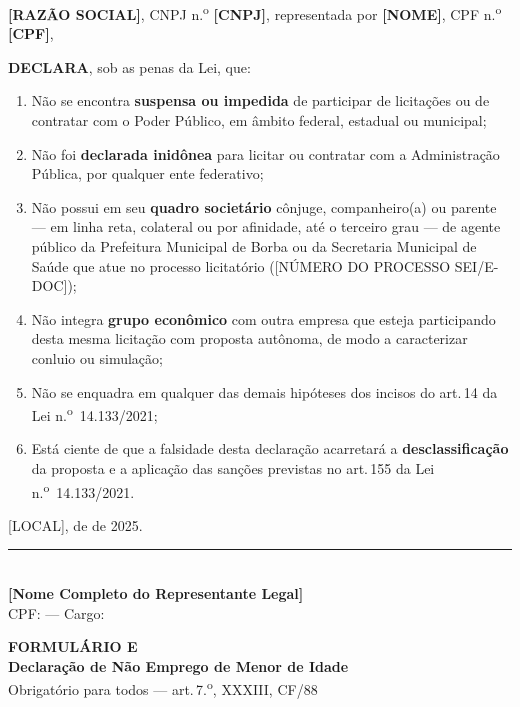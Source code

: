 \documentclass[12pt,a4paper]{article}
\newcommand{\formulario}[3]{%
  \clearpage
  \begin{tcolorbox}[enhanced,colback=navy,colframe=navy,arc=6pt,
    left=14pt,right=14pt,top=10pt,bottom=10pt]
    \color{white}
    {\large\bfseries FORMULÁRIO #1}\\[4pt]
    {\Large\bfseries #2}\\[4pt]
    {\small\color{ltblue} #3}
  \end{tcolorbox}
  \vspace{0.3cm}}
\newcommand{\art}[1]{art.\,#1}
\newcommand{\blank}[1]{\underline{\hspace{#1}}}
\newcommand{\procNum}{[NÚMERO DO PROCESSO SEI/E-DOC]}
\newcommand{\exercicio}{2025}
\begin{document}
\bigskip
\noindent\textbf{[RAZÃO SOCIAL]}, CNPJ n.\textsuperscript{o} \textbf{[CNPJ]},
representada por \textbf{[NOME]}, CPF n.\textsuperscript{o} \textbf{[CPF]},

\bigskip
\noindent\textbf{DECLARA}, sob as penas da Lei, que:

\begin{enumerate}
  \item Não se encontra \textbf{suspensa ou impedida} de participar de
    licitações ou de contratar com o Poder Público, em âmbito federal,
    estadual ou municipal;

  \item Não foi \textbf{declarada inidônea} para licitar ou contratar com a
    Administração Pública, por qualquer ente federativo;

  \item Não possui em seu \textbf{quadro societário} cônjuge, companheiro(a)
    ou parente --- em linha reta, colateral ou por afinidade, até o terceiro
    grau --- de agente público da Prefeitura Municipal de Borba ou da
    Secretaria Municipal de Saúde que atue no processo licitatório
    (\procNum);

  \item Não integra \textbf{grupo econômico} com outra empresa que esteja
    participando desta mesma licitação com proposta autônoma, de modo a
    caracterizar conluio ou simulação;

  \item Não se enquadra em qualquer das demais hipóteses dos incisos do
    \art{14} da Lei n.\textsuperscript{o}~14.133/2021;

  \item Está ciente de que a falsidade desta declaração acarretará a
    \textbf{desclassificação} da proposta e a aplicação das sanções previstas
    no \art{155} da Lei n.\textsuperscript{o}~14.133/2021.
\end{enumerate}

\vspace{1.2cm}
\begin{center}
  [LOCAL], \blank{0.8cm} de \blank{3cm} de \exercicio.\\[1.0cm]
  \rule{9cm}{0.5pt}\\[3pt]
  \textbf{[Nome Completo do Representante Legal]}\\
  \small CPF: \blank{3cm} --- Cargo: \blank{3cm}
\end{center}

\formulario{E}{Declaração de Não Emprego de Menor de Idade}{%
  Obrigatório para todos --- art.\,7.\textsuperscript{o}, XXXIII, CF/88}
\end{document}
